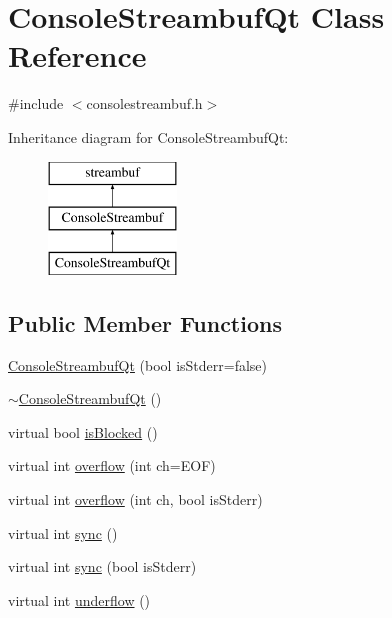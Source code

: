 \hypertarget{classstanfordcpplib_1_1qtgui_1_1ConsoleStreambufQt}{}\section{Console\+Streambuf\+Qt Class Reference}
\label{classstanfordcpplib_1_1qtgui_1_1ConsoleStreambufQt}


{\ttfamily \#include $<$consolestreambuf.\+h$>$}

Inheritance diagram for Console\+Streambuf\+Qt\+:\begin{figure}[H]
\begin{center}
\leavevmode
\includegraphics[height=3.000000cm]{classstanfordcpplib_1_1qtgui_1_1ConsoleStreambufQt}
\end{center}
\end{figure}
\subsection*{Public Member Functions}
\begin{DoxyCompactItemize}
\item 
\mbox{\hyperlink{classstanfordcpplib_1_1qtgui_1_1ConsoleStreambufQt_a98660042e1f344d995a0e2e80daee3e9}{Console\+Streambuf\+Qt}} (bool is\+Stderr=false)
\item 
\mbox{\hyperlink{classstanfordcpplib_1_1qtgui_1_1ConsoleStreambufQt_a04fd32aefbdede618e4f890306abd951}{$\sim$\+Console\+Streambuf\+Qt}} ()
\item 
virtual bool \mbox{\hyperlink{classstanfordcpplib_1_1ConsoleStreambuf_a61d5d93ba4956eefeb2e3d617d34c801}{is\+Blocked}} ()
\item 
virtual int \mbox{\hyperlink{classstanfordcpplib_1_1ConsoleStreambuf_adccb3cd5475ba3c83bc2b0a8cbd731c0}{overflow}} (int ch=E\+OF)
\item 
virtual int \mbox{\hyperlink{classstanfordcpplib_1_1ConsoleStreambuf_a5cfed6bdc955e2129ced962625045f8e}{overflow}} (int ch, bool is\+Stderr)
\item 
virtual int \mbox{\hyperlink{classstanfordcpplib_1_1ConsoleStreambuf_a810a727ce5554d3178e17b6bc55025dd}{sync}} ()
\item 
virtual int \mbox{\hyperlink{classstanfordcpplib_1_1ConsoleStreambuf_ad5f4344df2a20a0000adb05d4e656855}{sync}} (bool is\+Stderr)
\item 
virtual int \mbox{\hyperlink{classstanfordcpplib_1_1ConsoleStreambuf_aeb6918bd44153b257e097e2d2ef370ef}{underflow}} ()
\end{DoxyCompactItemize}
